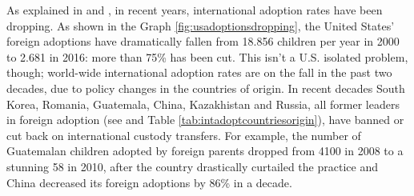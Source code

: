 As explained in \cite{adoptdropping_article} and \cite{adoptdropping_book}, in recent years, international adoption rates have been dropping. As shown in the Graph \ref{fig:usadoptionsdropping}, the United States' foreign adoptions have dramatically fallen from 18.856 children per year in 2000 to 2.681 in 2016: more than 75\% has been cut. This isn't a U.S. isolated problem, though; world-wide international adoption rates are on the fall in the past two decades, due to policy changes in the countries of origin. In recent decades South Korea, Romania, Guatemala, China, Kazakhistan and Russia, all former leaders in foreign adoption (see \cite{unreport} and Table \ref{tab:intadoptcountriesorigin}), have banned or cut back on international custody transfers. For example, the number of Guatemalan children adopted by foreign parents dropped from 4100 in 2008 to a stunning 58 in 2010, after the country drastically curtailed the practice and China decreased its foreign adoptions by 86\% in a decade.

